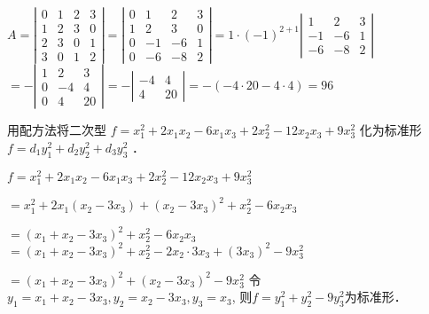 \begin{solution}
$A = \left|\begin{array}{cccc}
    0 & 1 & 2 & 3\\
    1 & 2 & 3 & 0\\
    2 & 3 & 0 & 1\\
    3 & 0 & 1 & 2
  \end{array}\right| = \left|\begin{array}{cccc}
    0 & 1 & 2 & 3\\
    1 & 2 & 3 & 0\\
    0 & - 1 & - 6 & 1\\
    0 & - 6 & - 8 & 2
  \end{array}\right| = 1 \cdot (- 1)^{2 + 1} \left|\begin{array}{ccc}
    1 & 2 & 3\\
    - 1 & - 6 & 1\\
    - 6 & - 8 & 2
  \end{array}\right|$ 
\qquad $= -\left|\begin{array}{ccc}
    1 & 2 & 3\\
    0 & - 4 & 4\\
    0 & 4 & 20
  \end{array}\right| = - \left|\begin{array}{cc}
    - 4 & 4\\
    4 & 20
  \end{array}\right| = -(-4\cdot20-4\cdot4) = 96$ 
\end{solution}


\begin{question}
用配方法将二次型 $f = x_1^2 + 2 x_1 x_2 - 6 x_1 x_3 + 2 x_2^2 - 12
x_2 x_3 + 9 x^2_3$ 化为标准形 $f = d_1 y^2_1 + d_2 y^2_2 + d_3 y^2_3$ ．
\end{question}

\begin{solution}
$f = x_1^2 + 2 x_1 x_2 - 6 x_1 x_3 + 2 x_2^2 - 12 x_2 x_3 + 9 x^2_3$ \par
\qquad$= x_1^2 + 2 x_1 (x_2 - 3 x_3) + (x_2 - 3 x_3)^2 + x_2^2 - 6 x_2 x_3 $ \par
\qquad$= (x_1 + x_2 - 3 x_3)^2 + x_2^2 - 6 x_2 x_3$ 
\qquad$= (x_1 + x_2 - 3 x_3)^2 + x_2^2 - 2 x_2 \cdot 3 x_3 + (3 x_3)^2 - 9x_3^2$ \par
\qquad$= (x_1 + x_2 - 3 x_3)^2 + (x_2 - 3 x_3)^2 - 9 x_3^2$ 
令$y_1 = x_1 + x_2 - 3 x_3, y_2 = x_2 - 3 x_3, y_3 = x_3$, \newline
则$f = y_1^2 + y_2^2 - 9y_3^2$为标准形．
\end{solution}


